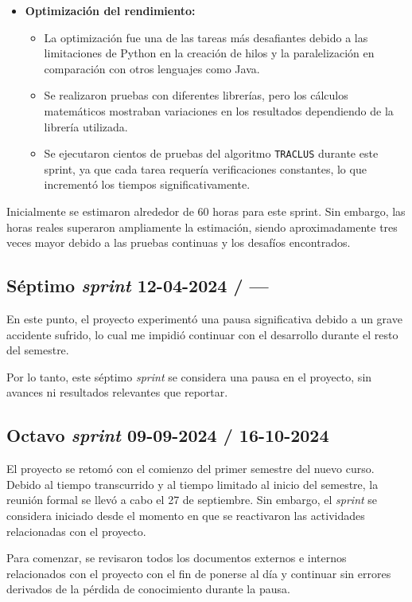 \begin{itemize}
    \item \textbf{Optimización del rendimiento:}
        \begin{itemize}
            \item La optimización fue una de las tareas más desafiantes debido a las limitaciones de Python en la creación de hilos y la paralelización en comparación con otros lenguajes como Java.
            \item Se realizaron pruebas con diferentes librerías, pero los cálculos matemáticos mostraban variaciones en los resultados dependiendo de la librería utilizada.
            \item Se ejecutaron cientos de pruebas del algoritmo \texttt{TRACLUS} durante este sprint, ya que cada tarea requería verificaciones constantes, lo que incrementó los tiempos significativamente.
        \end{itemize}
\end{itemize}  
     
Inicialmente se estimaron alrededor de 60 horas para este sprint. Sin embargo, las horas reales superaron ampliamente la estimación, siendo aproximadamente tres veces mayor debido a las pruebas continuas y los desafíos encontrados.

\subsection{Séptimo \textit{sprint} 12-04-2024 / ---}

En este punto, el proyecto experimentó una pausa significativa debido a un grave accidente sufrido, lo cual me impidió continuar con el desarrollo durante el resto del semestre. 

Por lo tanto, este séptimo \textit{sprint} se considera una pausa en el proyecto, sin avances ni resultados relevantes que reportar.

\subsection{Octavo \textit{sprint} 09-09-2024 / 16-10-2024}

El proyecto se retomó con el comienzo del primer semestre del nuevo curso. Debido al tiempo transcurrido y al tiempo limitado al inicio del semestre, la reunión formal se llevó a cabo el 27 de septiembre. Sin embargo, el \textit{sprint} se considera iniciado desde el momento en que se reactivaron las actividades relacionadas con el proyecto.

Para comenzar, se revisaron todos los documentos externos e internos relacionados con el proyecto con el fin de ponerse al día y continuar sin errores derivados de la pérdida de conocimiento durante la pausa.

